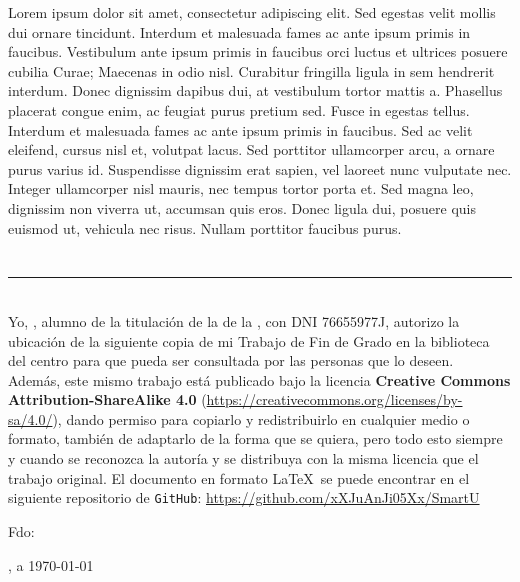 {{Lorem ipsum dolor sit amet, consectetur adipiscing elit. Sed egestas velit mollis dui ornare tincidunt. Interdum et malesuada fames ac ante ipsum primis in faucibus. Vestibulum ante ipsum primis in faucibus orci luctus et ultrices posuere cubilia Curae; Maecenas in odio nisl. Curabitur fringilla ligula in sem hendrerit interdum. Donec dignissim dapibus dui, at vestibulum tortor mattis a. Phasellus placerat congue enim, ac feugiat purus pretium sed. Fusce in egestas tellus. Interdum et malesuada fames ac ante ipsum primis in faucibus. Sed ac velit eleifend, cursus nisl et, volutpat lacus. Sed porttitor ullamcorper arcu, a ornare purus varius id. Suspendisse dignissim erat sapien, vel laoreet nunc vulputate nec. Integer ullamcorper nisl mauris, nec tempus tortor porta et. Sed magna leo, dignissim non viverra ut, accumsan quis eros. Donec ligula dui, posuere quis euismod ut, vehicula nec risus. Nullam porttitor faucibus purus.

\chapter*{}
\thispagestyle{empty}

\noindent\rule[-1ex]{\textwidth}{2pt}\\[4.5ex]

Yo, \textbf{\autor}, alumno de la titulación \textbf{\grado} de la \textbf{\escuela} de la \textbf{\universidad}, con DNI 76655977J, autorizo la ubicación de la siguiente copia de mi Trabajo de Fin de Grado en la biblioteca del centro para que pueda ser consultada por las personas que lo deseen. \\

Además, este mismo trabajo está publicado bajo la licencia \textbf{Creative Commons Attribution-ShareAlike 4.0} (\url{https://creativecommons.org/licenses/by-sa/4.0/}), dando permiso para copiarlo y redistribuirlo en cualquier medio o formato, también de adaptarlo de la forma que se quiera, pero todo esto siempre y cuando se reconozca la autoría y se distribuya con la misma licencia que el trabajo original. El documento en formato \LaTeX\ se puede encontrar en el siguiente repositorio de {\tt GitHub}: \url{https://github.com/xXJuAnJi05Xx/SmartU}

\vspace{4cm}

\noindent Fdo: \autor

\vspace{2cm}

\begin{flushright}
\ciudad, a \today
\end{flushright}

}}
